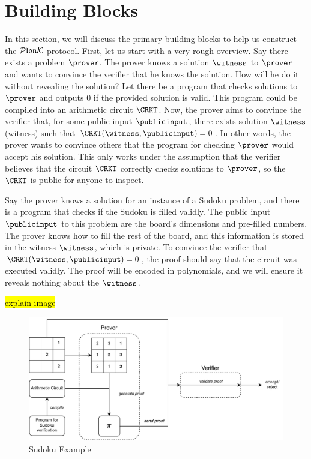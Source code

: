 \chapter{Building Blocks}
\label{chap:2}

In this section, we will discuss the primary building blocks to help us construct the $\mathcal{P}\mathfrak{lon}\mathcal{K}$ protocol. First, let us start with a very rough overview. Say there exists a problem $\prover$. The prover knows a solution $\witness$ to $\prover$ and wants to convince the verifier that he knows the solution. How will he do it without revealing the solution? Let there be a program that checks solutions to $\prover$ and outputs 0 if the provided solution is valid. This program could be compiled into an arithmetic circuit $\CRKT$. Now, the prover aims to convince the verifier that, for some public input $\publicinput$, there exists solution $\witness$ (witness) such that $\CRKT(\witness, \publicinput) = 0$. In other words, the prover wants to convince others that the program for checking $\prover$ would accept his solution. This only works under the assumption that the verifier believes that the circuit $\CRKT$ correctly checks solutions to $\prover$, so the $\CRKT$ is public for anyone to inspect.

\begin{example}
    Say the prover knows a solution for an instance of a Sudoku problem, and there is a program that checks if the Sudoku is filled validly. The public input $\publicinput$ to this problem are the board's dimensions and pre-filled numbers. The prover knows how to fill the rest of the board, and this information is stored in the witness $\witness$, which is private. To convince the verifier that $\CRKT(\witness, \publicinput) = 0$, the proof should say that the circuit was executed validly. The proof will be encoded in polynomials, and we will ensure it reveals nothing about the $\witness$.
\end{example}

\hl{explain image}

\begin{figure}[H]
    \centering
    \includegraphics[width=1\linewidth]{figures/sudoku.drawio.png}
    \caption{Sudoku Example}
\end{figure}

